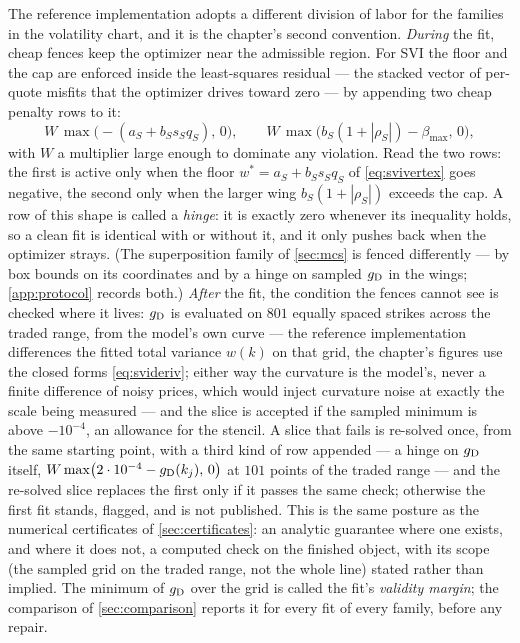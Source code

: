 The reference implementation adopts a different division of labor for
the families in the volatility chart, and it is the chapter's second
convention.  \emph{During} the fit, cheap fences keep the optimizer
near the admissible region.  For SVI the floor and the cap are
enforced inside the least-squares residual --- the stacked vector of
per-quote misfits that the optimizer drives toward zero --- by
appending two cheap penalty rows to it:
\begin{equation}
W\,\max\!\big(-(a_S+b_Ss_Sq_S),\,0\big),
\qquad
W\,\max\!\big(b_S(1+|\rho_S|)-\beta_{\max},\,0\big),
\label{eq:svipenalties}
\end{equation}
with $W$ a multiplier large enough to dominate any violation.  Read the
two rows: the first is active only when the floor $w^*=a_S+b_Ss_Sq_S$
of \eqref{eq:svivertex} goes negative, the second only when the larger
wing $b_S(1+|\rho_S|)$ exceeds the cap.  A row of this shape is called
a \emph{hinge}: it is exactly zero whenever its inequality holds, so a
clean fit is identical with or without it, and it only pushes back when
the optimizer strays.  (The superposition family of \cref{sec:mcs} is
fenced differently --- by box bounds on its coordinates and by a hinge
on sampled $g_{\rm D}$ in the wings; \cref{app:protocol} records
both.)  \emph{After} the fit, the condition the fences cannot see is
checked where it lives: $g_{\rm D}$ is evaluated on $801$ equally
spaced strikes across the traded range, from the model's own curve ---
the reference implementation differences the fitted total variance
$w(k)$ on that grid, the chapter's figures use the closed forms
\eqref{eq:svideriv}; either way the curvature is the model's, never a
finite difference of noisy prices, which would inject curvature noise
at exactly the scale being measured --- and the slice is accepted if
the sampled minimum is above $-10^{-4}$, an allowance for the stencil.
A slice that fails is re-solved once, from the same starting point,
with a third kind of row appended --- a hinge on $g_{\rm D}$ itself,
$W\max\!\big(2\cdot10^{-4}-g_{\rm D}(k_j),\,0\big)$ at $101$ points of
the traded range --- and the re-solved slice replaces the first only
if it passes the same check; otherwise the first fit stands, flagged,
and is not published.  This is the same posture as the numerical
certificates of \cref{sec:certificates}: an analytic guarantee where
one exists, and where it does not, a computed check on the finished
object, with its scope (the sampled grid on the traded range, not the
whole line) stated rather than implied.  The minimum of $g_{\rm D}$
over the grid is called the fit's \emph{validity margin}; the
comparison of \cref{sec:comparison} reports it for every fit of every
family, before any repair.

